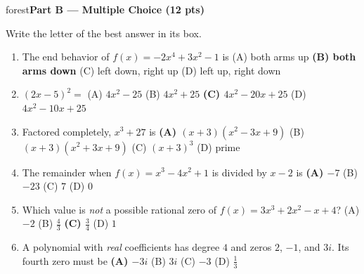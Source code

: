 \documentclass[10pt]{article}
\newcommand{\parthead}[1]{%
  \vspace{6pt}\noindent
  \begin{headlinebox}{forest}\color{white}\bfseries #1\end{headlinebox}%
  \vspace{4pt}}
\begin{document}
\parthead{Part B --- Multiple Choice (12 pts)}
Write the letter of the best answer in its box.

\begin{enumerate}[leftmargin=\dimexpr1.9em+0.4in+6pt\relax, itemsep=9pt]
  \item \leavevmode\llap{\choicebox{\gradedblank[id=qb1, type=choice, points=2, answer={B}]{0.4in}{10pt}}\hspace{\dimexpr\leftmargin-0.4in-2pt\relax}}The end behavior of $f(x)=-2x^4+3x^2-1$ is
    \hfill (A) both arms up \quad \textbf{(B) both arms down} \ans{$\leftarrow$} \quad (C) left down, right up \quad (D) left up, right down
  \item \leavevmode\llap{\choicebox{\gradedblank[id=qb2, type=choice, points=2, answer={C}]{0.4in}{10pt}}\hspace{\dimexpr\leftmargin-0.4in-2pt\relax}}$(2x-5)^2=$
    \hfill (A) $4x^2-25$ \quad (B) $4x^2+25$ \quad \textbf{(C) $4x^2-20x+25$} \ans{$\leftarrow$} \quad (D) $4x^2-10x+25$
  \item \leavevmode\llap{\choicebox{\gradedblank[id=qb3, type=choice, points=2, answer={A}]{0.4in}{10pt}}\hspace{\dimexpr\leftmargin-0.4in-2pt\relax}}Factored completely, $x^3+27$ is
    \hfill \textbf{(A) $(x+3)(x^2-3x+9)$} \ans{$\leftarrow$} \quad (B) $(x+3)(x^2+3x+9)$ \quad (C) $(x+3)^3$ \quad (D) prime
  \item \leavevmode\llap{\choicebox{\gradedblank[id=qb4, type=choice, points=2, answer={A}]{0.4in}{10pt}}\hspace{\dimexpr\leftmargin-0.4in-2pt\relax}}The remainder when $f(x)=x^3-4x^2+1$ is divided by $x-2$ is
    \hfill \textbf{(A) $-7$} \ans{$\leftarrow$} \quad (B) $-23$ \quad (C) $7$ \quad (D) $0$
  \item \leavevmode\llap{\choicebox{\gradedblank[id=qb5, type=choice, points=2, answer={C}]{0.4in}{10pt}}\hspace{\dimexpr\leftmargin-0.4in-2pt\relax}}Which value is \emph{not} a possible rational zero of $f(x)=3x^3+2x^2-x+4$?
    \hfill (A) $-2$ \quad (B) $\frac{4}{3}$ \quad \textbf{(C) $\frac{3}{4}$} \ans{$\leftarrow$} \quad (D) $1$
  \item \leavevmode\llap{\choicebox{\gradedblank[id=qb6, type=choice, points=2, answer={A}]{0.4in}{10pt}}\hspace{\dimexpr\leftmargin-0.4in-2pt\relax}}A polynomial with \emph{real} coefficients has degree $4$ and zeros $2$, $-1$, and $3i$. Its fourth zero must be
    \hfill \textbf{(A) $-3i$} \ans{$\leftarrow$} \quad (B) $3i$ \quad (C) $-3$ \quad (D) $\frac13$
\end{enumerate}
\end{document}
